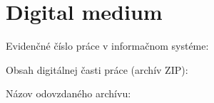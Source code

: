 \thispagestyle{empty}
\setcounter{figure}{0}
\chapter{Digital medium}
\renewcommand*{\thepage}{C-\arabic{page}}
\par Evidenčné číslo práce v informačnom systéme: \RegNo
\par Obsah digitálnej časti práce (archív ZIP):
\par Názov odovzdaného archívu: 

